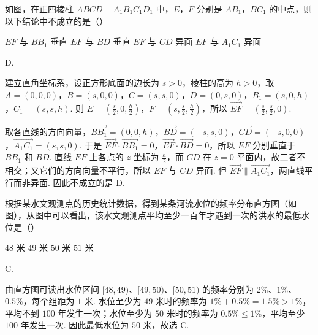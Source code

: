 \begin{problem}
如图，在正四棱柱 \(ABCD - A_{1}B_{1}C_{1}D_{1}\) 中，\(E\)，\(F\) 分别是 \(AB_{1}\)，\(BC_{1}\) 的中点，则以下结论中不成立的是（\quad）


\choices
    {\(EF\) 与 \(BB_{1}\) 垂直}
    {\(EF\) 与 \(BD\) 垂直}
    {\(EF\) 与 \(CD\) 异面}
    {\(EF\) 与 \(A_{1}C_{1}\) 异面}
\end{problem}

\begin{answer}
D.
\end{answer}

\begin{solution}
建立直角坐标系，设正方形底面的边长为 \(s>0\)，棱柱的高为 \(h>0\)，取
\(A=(0,0,0)\)，\(B=(s,0,0)\)，\(C=(s,s,0)\)，\(D=(0,s,0)\)，\(B_{1}=(s,0,h)\)，\(C_{1}=(s,s,h)\). 则
\(E=\left(\frac{s}{2},0,\frac{h}{2}\right)\)，\(F=\left(s,\frac{s}{2},\frac{h}{2}\right)\)，所以 \(\overrightarrow{EF}=\left(\frac{s}{2},\frac{s}{2},0\right)\).

取各直线的方向向量，\(\overrightarrow{BB_{1}}=(0,0,h)\)，\(\overrightarrow{BD}=(-s,s,0)\)，\(\overrightarrow{CD}=(-s,0,0)\)，\(\overrightarrow{A_{1}C_{1}}=(s,s,0)\). 于是
\(\overrightarrow{EF}\cdot\overrightarrow{BB_{1}}=0\)，\(\overrightarrow{EF}\cdot\overrightarrow{BD}=0\)，所以 \(EF\) 分别垂直于 \(BB_{1}\) 和 \(BD\). 直线 \(EF\) 上各点的 \(z\) 坐标为 \(\frac{h}{2}\)，而 \(CD\) 在 \(z=0\) 平面内，故二者不相交；又它们的方向向量不平行，所以 \(EF\) 与 \(CD\) 异面. 但 \(\overrightarrow{EF}\parallel\overrightarrow{A_{1}C_{1}}\)，两直线平行而非异面. 因此不成立的是 D.
\end{solution}

\begin{problem}
根据某水文观测点的历史统计数据，得到某条河流水位的频率分布直方图（如图），从图中可以看出，该水文观测点平均至少一百年才遇到一次的洪水的最低水位是（\quad）


\choices
    {\(48\text{ 米}\)}
    {\(49\text{ 米}\)}
    {\(50\text{ 米}\)}
    {\(51\text{ 米}\)}
\end{problem}

\begin{answer}
C.
\end{answer}

\begin{solution}
由直方图可读出水位区间 \([48,49)\)、\([49,50)\)、\([50,51)\) 的频率分别为 \(2\%\)、\(1\%\)、\(0.5\%\)，每个组距为 \(1\) 米. 水位至少为 \(49\) 米时的频率为 \(1\%+0.5\%=1.5\%>1\%\)，平均不到 \(100\) 年发生一次；水位至少为 \(50\) 米时的频率为 \(0.5\%\leqslant1\%\)，平均至少 \(100\) 年发生一次. 因此最低水位为 \(50\) 米，故选 C.
\end{solution}


